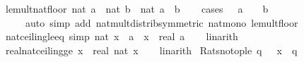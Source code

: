 \begin{isabellebody}
\isanewline
%
\endisadelimproof
\isanewline
{}\isamarkupfalse%
\ le{\isacharunderscore}{\kern0pt}mult{\isacharunderscore}{\kern0pt}nat{\isacharunderscore}{\kern0pt}floor{\isacharcolon}{\kern0pt}\ {\isachardoublequoteopen}nat\ {\isasymlfloor}a{\isasymrfloor}\ {\isacharasterisk}{\kern0pt}\ nat\ {\isasymlfloor}b{\isasymrfloor}\ {\isasymle}\ nat\ {\isasymlfloor}a\ {\isacharasterisk}{\kern0pt}\ b{\isasymrfloor}{\isachardoublequoteclose}\isanewline
%
\isadelimproof
\ \ %
\endisadelimproof
%
\isatagproof
{}\isamarkupfalse%
\ {\isacharparenleft}{\kern0pt}cases\ {\isachardoublequoteopen}{}\ {\isasymle}\ a\ {\isasymand}\ {}\ {\isasymle}\ b{\isachardoublequoteclose}{\isacharparenright}{\kern0pt}\isanewline
\ \ \ \ \ {\isacharparenleft}{\kern0pt}auto\ simp\ add{\isacharcolon}{\kern0pt}\ nat{\isacharunderscore}{\kern0pt}mult{\isacharunderscore}{\kern0pt}distrib{\isacharbrackleft}{\kern0pt}symmetric{\isacharbrackright}{\kern0pt}\ nat{\isacharunderscore}{\kern0pt}mono\ le{\isacharunderscore}{\kern0pt}mult{\isacharunderscore}{\kern0pt}floor{\isacharparenright}{\kern0pt}%
\endisatagproof
{\isafoldproof}%
%
\isadelimproof
\isanewline
%
\endisadelimproof
\isanewline
{}\isamarkupfalse%
\ nat{\isacharunderscore}{\kern0pt}ceiling{\isacharunderscore}{\kern0pt}le{\isacharunderscore}{\kern0pt}eq\ {\isacharbrackleft}{\kern0pt}simp{\isacharbrackright}{\kern0pt}{\isacharcolon}{\kern0pt}\ {\isachardoublequoteopen}nat\ {\isasymlceil}x{\isasymrceil}\ {\isasymle}\ a\ {\isasymlongleftrightarrow}\ x\ {\isasymle}\ real\ a{\isachardoublequoteclose}\isanewline
%
\isadelimproof
\ \ %
\endisadelimproof
%
\isatagproof
{}\isamarkupfalse%
\ linarith%
\endisatagproof
{\isafoldproof}%
%
\isadelimproof
\isanewline
%
\endisadelimproof
\isanewline
{}\isamarkupfalse%
\ real{\isacharunderscore}{\kern0pt}nat{\isacharunderscore}{\kern0pt}ceiling{\isacharunderscore}{\kern0pt}ge{\isacharcolon}{\kern0pt}\ {\isachardoublequoteopen}x\ {\isasymle}\ real\ {\isacharparenleft}{\kern0pt}nat\ {\isasymlceil}x{\isasymrceil}{\isacharparenright}{\kern0pt}{\isachardoublequoteclose}\isanewline
%
\isadelimproof
\ \ %
\endisadelimproof
%
\isatagproof
{}\isamarkupfalse%
\ linarith%
\endisatagproof
{\isafoldproof}%
%
\isadelimproof
\isanewline
%
\endisadelimproof
\isanewline
{}\isamarkupfalse%
\ Rats{\isacharunderscore}{\kern0pt}no{\isacharunderscore}{\kern0pt}top{\isacharunderscore}{\kern0pt}le{\isacharcolon}{\kern0pt}\ {\isachardoublequoteopen}{\isasymexists}q\ {\isasymin}\ {\isasymrat}{\isachardot}{\kern0pt}\ x\ {\isasymle}\ q{\isachardoublequoteclose}\isanewline

\end{isabellebody}
